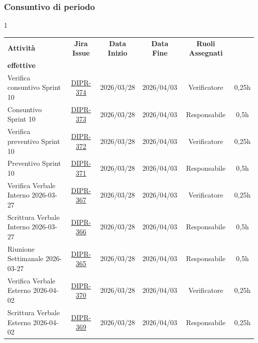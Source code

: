 \documentclass[a4paper,12pt]{article}
\begin{document}
\subsubsection{Consuntivo di periodo}
\begin{spacing}{1}
    \small
\begin{longtable}{|p{4cm}|c|c|c|c|c|}
        \hline
        \rowcolor{zpusgreen!30}
        \textbf{Attività} & \textbf{Jira Issue} & \textbf{Data Inizio} & \textbf{Data Fine} & \textbf{Ruoli Assegnati} & \begin{tabular}[c]{@{}c@{}} \textbf{Ore} \\ \textbf{effettive} \end{tabular} \\
        \hline
        Verifica consuntivo Sprint 10 & \href{https://7zpus.atlassian.net/browse/DIPR-374}{DIPR-374} & 2026/03/28 & 2026/04/03 & Verificatore & 0,25h \\
        \hline
        Consuntivo Sprint 10 & \href{https://7zpus.atlassian.net/browse/DIPR-373}{DIPR-373} & 2026/03/28 & 2026/04/03 & Responsabile & 0,5h \\
        \hline
        Verifica preventivo Sprint 10 & \href{https://7zpus.atlassian.net/browse/DIPR-372}{DIPR-372} & 2026/03/28 & 2026/04/03 & Verificatore & 0,25h \\
        \hline
        Preventivo Sprint 10 & \href{https://7zpus.atlassian.net/browse/DIPR-371}{DIPR-371} & 2026/03/28 & 2026/04/03 & Responsabile & 0,5h \\
        \hline
        Verifica Verbale Interno 2026-03-27 & \href{https://7zpus.atlassian.net/browse/DIPR-367}{DIPR-367} & 2026/03/28 & 2026/04/03 & Verificatore & 0,25h \\
        \hline
        Scrittura Verbale Interno 2026-03-27 & \href{https://7zpus.atlassian.net/browse/DIPR-366}{DIPR-366} & 2026/03/28 & 2026/04/03 & Responsabile & 0,5h \\
        \hline
        Riunione Settimanale 2026-03-27 & \href{https://7zpus.atlassian.net/browse/DIPR-365}{DIPR-365} & 2026/03/28 & 2026/04/03 & Responsabile & 0,5h \\
        \hline
        Verifica Verbale Esterno 2026-04-02 & \href{https://7zpus.atlassian.net/browse/DIPR-370}{DIPR-370} & 2026/03/28 & 2026/04/03 & Verificatore & 0,25h \\
        \hline
        Scrittura Verbale Esterno 2026-04-02 & \href{https://7zpus.atlassian.net/browse/DIPR-369}{DIPR-369} & 2026/03/28 & 2026/04/03 & Responsabile & 0,25h \\

\end{longtable}
\end{spacing}
\end{document}
